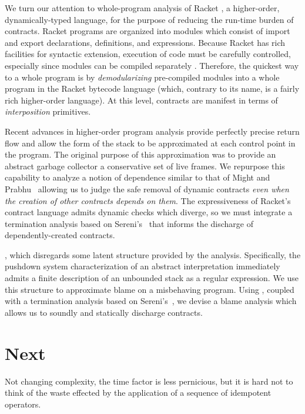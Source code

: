 \documentclass{sigplanconf}
\begin{document}
We turn our attention to whole-program analysis of Racket \cite{plt-tr1}, a higher-order, dynamically-typed language, for the purpose of reducing the run-time burden of contracts.
Racket programs are organized into modules which consist of import and export declarations, definitions, and expressions.
Because Racket has rich facilities for syntactic extension, execution of code must be carefully controlled, especially since modules can be compiled separately \cite{flatt2002composable}.
Therefore, the quickest way to a whole program is by \emph{demodularizing} pre-compiled modules into a whole program in the Racket bytecode language (which, contrary to its name, is a fairly rich higher-order language).
At this level, contracts are manifest in terms of \emph{interposition} primitives.

Recent advances in higher-order program analysis \cite{earl2012introspective} provide perfectly precise return flow and allow the form of the stack to be approximated at each control point in the program.
The original purpose of this approximation was to provide an abstract garbage collector a conservative set of live frames.
We repurpose this capability to analyze a notion of dependence similar to that of Might and Prabhu~\cite{might2009interprocedural} allowing us to judge the safe removal of dynamic contracts \emph{even when the creation of other contracts depends on them}.
The expressiveness of Racket's contract language admits dynamic checks which diverge, so we must integrate a termination analysis based on Sereni's~\cite{sereni2007termination} that informs the discharge of dependently-created contracts.

, which disregards some latent structure provided by the analysis.
Specifically, the pushdown system characterization of an abstract interpretation immediately admits a finite description of an unbounded stack as a regular expression.
We use this structure to approximate blame on a misbehaving program.
Using , coupled with a termination analysis based on Sereni's~\cite{sereni2007termination}, we devise a blame analysis which allows us to soundly and statically discharge contracts.

\section{Next}

Not changing complexity, the time factor is less pernicious, but it is hard not to think of the waste effected by the application of a sequence of idempotent operators.
\end{document}
